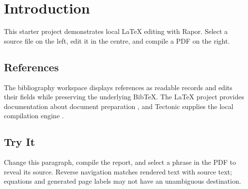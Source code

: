 \section{Introduction}
This starter project demonstrates local LaTeX editing with Rapor. Select a source file on the left, edit it in the centre, and compile a PDF on the right.

\subsection{References}
The bibliography workspace displays references as readable records and edits their fields while preserving the underlying BibTeX. The LaTeX project provides documentation about document preparation \citep{latex}, and Tectonic supplies the local compilation engine \citep{tectonic}.

\subsection{Try It}
Change this paragraph, compile the report, and select a phrase in the PDF to reveal its source. Reverse navigation matches rendered text with source text; equations and generated page labels may not have an unambiguous destination.
